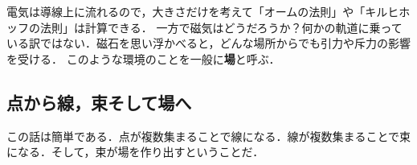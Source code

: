 \documentclass[a4paper,11pt]{ltjsarticle}
\begin{document}
電気は導線上に流れるので，大きさだけを考えて「オームの法則」や「キルヒホッフの法則」は計算できる．
一方で磁気はどうだろうか？何かの軌道に乗っている訳ではない．磁石を思い浮かべると，どんな場所からでも引力や斥力の影響を受ける．
このような環境のことを一般に\textbf{場}と呼ぶ．

\subsection{点から線，束そして場へ}

この話は簡単である．点が複数集まることで線になる．線が複数集まることで束になる．そして，束が場を作り出すということだ．
\end{document}
